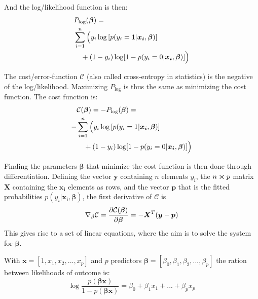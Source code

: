 And the log/likelihood function is then:
\begin{equation}
\begin{split}
    &P_{\log}(\boldsymbol{\beta}) = \\
    &\sum_{i=1}^n \Big(y_i \log \qty[p(y_i = 1|\boldsymbol{x_i},\boldsymbol{\beta})] \\
    &\quad+ (1-y_i) \log [1 - p(y_i = 0|\boldsymbol{x_i},\boldsymbol{\beta})]\Big)
\end{split}
\label{eq:log_p}
\end{equation}

The cost/error-function $\mathcal{C}$ (also called cross-entropy in statistics) is the negative of the log/likelihood. Maximizing $P_{\log}$ is thus the same as minimizing the cost function. The cost function is:
\begin{equation}
  \begin{split}
    &\mathcal{C}(\boldsymbol{\beta}) = - P_{\log}(\boldsymbol{\beta}) =  \\
    -&\sum_{i=1}^n \Big(y_i \log \qty[p(y_i = 1|\boldsymbol{x_i},\boldsymbol{\beta})] \\
    &\quad+ (1-y_i) \log [1 - p(y_i = 0|\boldsymbol{x_i},\boldsymbol{\beta})]\Big)
  \end{split}
  \label{eq:cost_function}
\end{equation}

Finding the parameters $\boldsymbol{\beta}$ that minimize the cost function is then done through differentiation.
Defining the vector $\boldsymbol{y}$ containing $n$ elements $y_i$, the $n \cross p$ matrix $\boldsymbol{X}$ containing the $\boldsymbol{x_i}$ elements as rows, and the vector $\boldsymbol{p}$ that is the fitted probabilities $p(y_i|\boldsymbol{x_i},\boldsymbol{\beta})$, the first derivative of $\mathcal{C}$ is
\begin{equation}
  \nabla_\beta \mathcal{C} = \pdv{\mathcal{C}(\boldsymbol{\beta})}{\boldsymbol{\beta}} = - \boldsymbol{X}^T (\boldsymbol{y}-\boldsymbol{p})
  \label{eq:cost_d}
\end{equation}
This gives rise to a set of linear equations, where the aim is to solve the system for $\boldsymbol{\beta}$.

With $\boldsymbol{x} = [1, x_1,x_2,...,x_p]$ and $p$ predictors $\boldsymbol{\beta} = [\beta_0,\beta_1,\beta_2,...,\beta_p]$ the ration between likelihoods of outcome is:
\begin{equation}
  \log \frac{p(\boldsymbol{\beta}\boldsymbol{x})}{1-p(\boldsymbol{\beta}\boldsymbol{x})} = \beta_0 + \beta_1x_1 + ... + \beta_px_p
  \label{eq:prob_ratio}
\end{equation}

